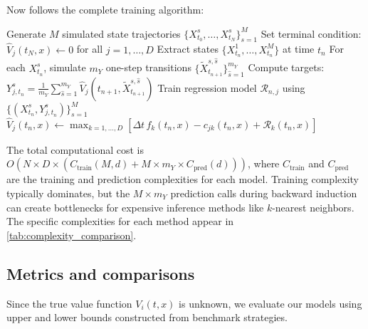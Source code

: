 \documentclass[11pt,reqno,a4paper]{amsart}
\theoremstyle{definition}
\numberwithin{equation}{section}
\DeclareMathOperator{\1}{\mathbbm{1}}
\begin{document}
Now follows the complete training algorithm:
\begin{algorithm}[H]
  \caption{Value Function Approximation via Regression}
  \label{alg:main}
  \begin{algorithmic}[1]
    \State Generate $M$ simulated state trajectories $\{X_{t_0}^s, \ldots, X_{t_N}^s\}_{s=1}^M$
    \State Set terminal condition: $\widehat{V}_{j}(t_N,x) \gets 0$ for all $j=1,\ldots,D$
     
    \State Extract states $\{X_{t_n}^1, \ldots, X_{t_n}^M\}$ at time $t_n$
    \State For each $X_{t_n}^s$, simulate $m_Y$ one-step transitions $\{\widetilde{X}_{t_{n+1}}^{s,\hat{s}}\}_{\hat{s}=1}^{m_Y}$
     
    \State Compute targets: $Y_{j,t_n}^s = \frac{1}{m_Y}\sum_{\hat{s}=1}^{m_Y} \widehat{V}_j(t_{n+1},\widetilde{X}_{t_{n+1}}^{s,\hat{s}})$
    \State Train regression model $\mathcal{R}_{n,j}$ using $\{(X_{t_n}^s, Y_{j,t_n}^s)\}_{s=1}^M$
    \EndFor
     
    \State $\widehat{V}_j(t_n,x) \gets \max_{k=1,\dots,D}[\Delta t\, f_k(t_n,x) - c_{jk}(t_n,x) + \mathcal{R}_{k}(t_n,x)]$
    \EndFor
    \EndFor
  \end{algorithmic}
\end{algorithm}
The total computational cost is $O(N \times D \times (C_{\text{train}}(M,d) + M \times m_Y \times C_{\text{pred}}(d)))$, where $C_{\text{train}}$ and $C_{\text{pred}}$ are the training and prediction complexities for each model. Training complexity typically dominates, but the $M \times m_Y$ prediction calls during backward induction can create bottlenecks for expensive inference methods like $k$-nearest neighbors. The specific complexities for each method appear in \cref{tab:complexity_comparison}.

\subsection{Metrics and comparisons}\label{sec:metrics}
Since the true value function $V_i(t,x)$ is unknown, we evaluate our models using upper and lower bounds constructed from benchmark strategies.
\end{document}
